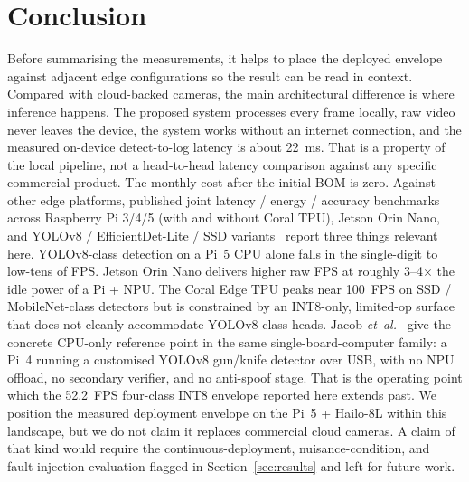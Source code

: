 \documentclass{ieeeaccess}
\begin{document}
\section{Conclusion}
\label{sec:conclusion}
Before summarising the measurements, it helps to place the deployed envelope against adjacent edge configurations so the result can be read in context. Compared with cloud-backed cameras, the main architectural difference is where inference happens. The proposed system processes every frame locally, raw video never leaves the device, the system works without an internet connection, and the measured on-device detect-to-log latency is about 22~ms. That is a property of the local pipeline, not a head-to-head latency comparison against any specific commercial product. The monthly cost after the initial BOM is zero. Against other edge platforms, published joint latency / energy / accuracy benchmarks across Raspberry Pi 3/4/5 (with and without Coral TPU), Jetson Orin Nano, and YOLOv8 / EfficientDet-Lite / SSD variants~\cite{b25,b26} report three things relevant here. YOLOv8-class detection on a Pi~5 CPU alone falls in the single-digit to low-tens of FPS. Jetson Orin Nano delivers higher raw FPS at roughly 3--4$\times$ the idle power of a Pi + NPU. The Coral Edge TPU peaks near 100~FPS on SSD / MobileNet-class detectors but is constrained by an INT8-only, limited-op surface that does not cleanly accommodate YOLOv8-class heads. Jacob \emph{et~al.}~\cite{b28} give the concrete CPU-only reference point in the same single-board-computer family: a Pi~4 running a customised YOLOv8 gun/knife detector over USB, with no NPU offload, no secondary verifier, and no anti-spoof stage. That is the operating point which the 52.2~FPS four-class INT8 envelope reported here extends past. We position the measured deployment envelope on the Pi~5 + Hailo-8L within this landscape, but we do not claim it replaces commercial cloud cameras. A claim of that kind would require the continuous-deployment, nuisance-condition, and fault-injection evaluation flagged in Section~\ref{sec:results} and left for future work.
\end{document}
